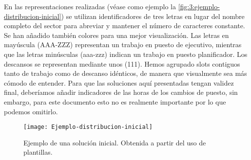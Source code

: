 En las representaciones realizadas (véase como ejemplo la \autoref{fig:3:ejemplo-distribucion-inicial}) se utilizan identificadores de tres letras en lugar del nombre completo del sector para abreviar y mantener el número de caracteres constante.
Se han añadido también colores para una mejor visualización.
Las letras en mayúscula (AAA-ZZZ) representan un trabajo en puesto de ejecutivo, mientras que las letras minúsculas (aaa-zzz) indican un trabajo en puesto planificador. Los descansos se representan mediante unos (111).
Hemos agrupado slots contiguos tanto de trabajo como de descanso idénticos, de manera que visualmente sea más cómodo de entender. Para que las soluciones aquí presentadas tengan validez final, deberíamos añadir indicadores de las horas de los cambios de puesto, sin embargo, para este documento esto no es realmente importante por lo que podemos omitirlo.



\begin{figure}[htbp]
	\centering
	\texttt{[image: Ejemplo-distribucion-inicial]}
	\caption[Ejemplo de una solución inicial]{Ejemplo de una solución inicial. Obtenida a partir del uso 
		de plantillas.}
	\label{fig:3:ejemplo-distribucion-inicial}
\end{figure}





